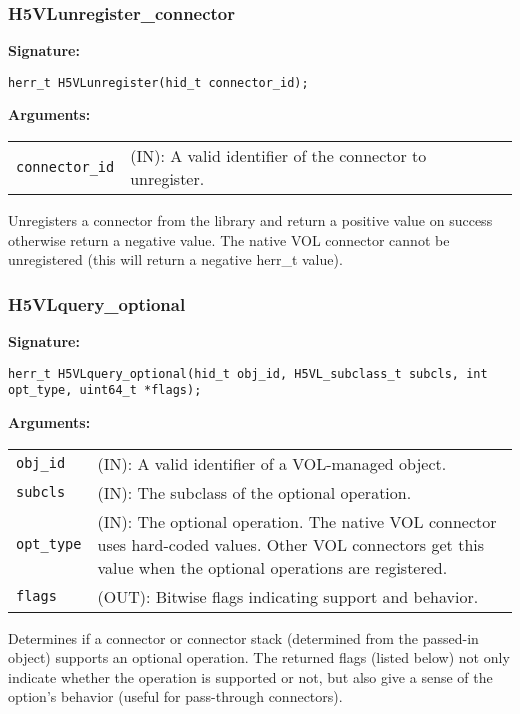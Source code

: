 \subsubsection{H5VLunregister\_connector}
\begin{mdframed}[style=bgbox]
\textbf{Signature:}
\begin{lstlisting}
herr_t H5VLunregister(hid_t connector_id);
\end{lstlisting}
\textbf{Arguments:}\\
\begin{tabular}{l p{13.5cm}}
  {\tt connector\_id} & (IN): A valid identifier of the connector to unregister.\\
\end{tabular}
\end{mdframed}
Unregisters a connector from the library and return a positive value on success otherwise return a negative value. The native VOL connector cannot be unregistered (this will return a negative herr\_t value).
\bigskip


\subsubsection{H5VLquery\_optional}
\begin{mdframed}[style=bgbox]
\textbf{Signature:}
\begin{lstlisting}
herr_t H5VLquery_optional(hid_t obj_id, H5VL_subclass_t subcls, int opt_type, uint64_t *flags);
\end{lstlisting}
\textbf{Arguments:}\\
\begin{tabular}{l p{13.5cm}}
  {\tt obj\_id} & (IN): A valid identifier of a VOL-managed object.\\
  {\tt subcls} & (IN): The subclass of the optional operation.\\
  {\tt opt\_type} & (IN): The optional operation. The native VOL connector uses hard-coded values. Other VOL connectors get this value when the optional operations are registered.\\
  {\tt flags} & (OUT): Bitwise flags indicating support and behavior.\\
\end{tabular}
\end{mdframed}
Determines if a connector or connector stack (determined from the passed-in object) supports an optional operation. The returned flags (listed below) not only indicate whether the operation is supported or not, but also give a sense of the option's behavior (useful for pass-through connectors).

